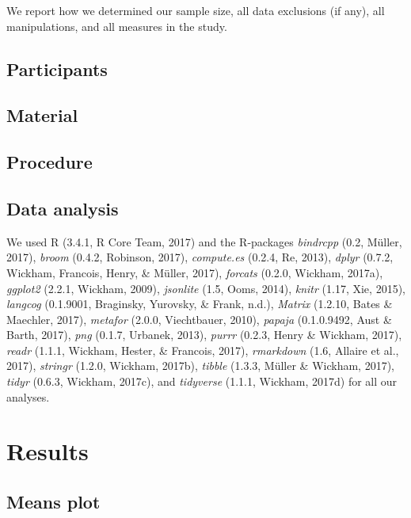 \documentclass[english,floatsintext,man]{apa6}
\theoremstyle{definition}
\theoremstyle{definition}
\theoremstyle{remark}
\begin{document}
We report how we determined our sample size, all data exclusions (if
any), all manipulations, and all measures in the study.

\subsection{Participants}\label{participants}

\subsection{Material}\label{material}

\subsection{Procedure}\label{procedure}

\subsection{Data analysis}\label{data-analysis}

We used R (3.4.1, R Core Team, 2017) and the R-packages \emph{bindrcpp}
(0.2, Müller, 2017), \emph{broom} (0.4.2, Robinson, 2017),
\emph{compute.es} (0.2.4, Re, 2013), \emph{dplyr} (0.7.2, Wickham,
Francois, Henry, \& Müller, 2017), \emph{forcats} (0.2.0, Wickham,
2017a), \emph{ggplot2} (2.2.1, Wickham, 2009), \emph{jsonlite} (1.5,
Ooms, 2014), \emph{knitr} (1.17, Xie, 2015), \emph{langcog} (0.1.9001,
Braginsky, Yurovsky, \& Frank, n.d.), \emph{Matrix} (1.2.10, Bates \&
Maechler, 2017), \emph{metafor} (2.0.0, Viechtbauer, 2010),
\emph{papaja} (0.1.0.9492, Aust \& Barth, 2017), \emph{png} (0.1.7,
Urbanek, 2013), \emph{purrr} (0.2.3, Henry \& Wickham, 2017),
\emph{readr} (1.1.1, Wickham, Hester, \& Francois, 2017),
\emph{rmarkdown} (1.6, Allaire et al., 2017), \emph{stringr} (1.2.0,
Wickham, 2017b), \emph{tibble} (1.3.3, Müller \& Wickham, 2017),
\emph{tidyr} (0.6.3, Wickham, 2017c), and \emph{tidyverse} (1.1.1,
Wickham, 2017d) for all our analyses.

\section{Results}\label{results}

\subsection{Means plot}\label{means-plot}
\end{document}
